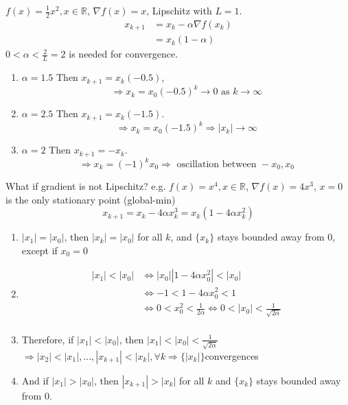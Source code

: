 \documentclass[11pt]{elegantbook}
\begin{document}
\begin{example}
    $f(x)=\frac{1}{2}x^2,x\in \mathbb{R}$, $\nabla f(x)=x$, Lipschitz with $L=1$.
    \begin{equation}
        \begin{aligned}
            x_{k+1}&=x_k-\alpha \nabla f(x_k)\\
            &=x_k(1-\alpha)
        \end{aligned}
        \nonumber
    \end{equation}
    $0<\alpha<\frac{2}{L}=2$ is needed for convergence.
\end{example}

\begin{enumerate}[Test $(1)$]
    \item $\alpha=1.5$ Then $x_{k+1}=x_k(-0.5)$, $$\Rightarrow x_k=x_0(-0.5)^k \rightarrow 0 \text{ as } k \rightarrow \infty$$
    \item $\alpha=2.5$ Then $x_{k+1}=x_k(-1.5)$. $$\Rightarrow x_k=x_0(-1.5)^k \Rightarrow	|x_k| \rightarrow	\infty$$
    \item $\alpha=2$ Then $x_{k+1}=-x_k$. $$\Rightarrow	 x_k=(-1)^kx_0 \Rightarrow \text{ oscillation between }-x_0,x_0$$
\end{enumerate}

\begin{example}
What if gradient is not Lipschitz? e.g. $f(x)=x^4,x\in \mathbb{R}$, $\nabla f(x)=4x^3$, $x=0$ is the only stationary point (global-min)
$$x_{k+1}=x_k-4\alpha x_k^3=x_k(1-4\alpha x_k^2)$$
\end{example}
\begin{enumerate}[$\bullet$]
    \item $|x_1|=|x_0|$, then $|x_k|=|x_0|$ for all $k$, and $\{x_k\}$ stays bounded away from $0$, except if $x_0=0$
    \item \begin{equation}
        \begin{aligned}
            |x_1|<|x_0| &\Leftrightarrow	|x_0||1-4\alpha x_0^2|<|x_0|\\
            &\Leftrightarrow -1<1-4\alpha x_0^2<1\\
            &\Leftrightarrow 0<x_0^2<\frac{1}{2\alpha} \Leftrightarrow	0<|x_0|<\frac{1}{\sqrt{2\alpha}}\\
        \end{aligned}
        \nonumber
    \end{equation}
    \item Therefore, if $|x_1|<|x_0|$, then $|x_1|<|x_0|<\frac{1}{\sqrt{2\alpha}}$ $\Rightarrow	|x_2|<|x_1|,...,|x_{k+1}|<|x_k|,\forall k \Rightarrow \{|x_k|\}$convergences
    \item And if $|x_1|>|x_0|$, then $|x_{k+1}|>|x_k|$ for all $k$ and $\{x_k\}$ stays bounded away from $0$.
\end{enumerate}
\end{document}
